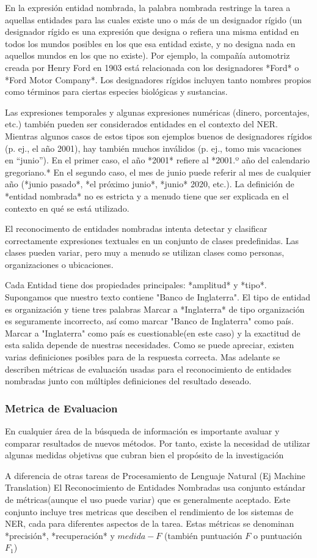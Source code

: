 \documentclass{llncs}
\begin{document}
	En la expresión entidad nombrada, la palabra nombrada restringe la tarea a aquellas entidades para las cuales existe uno o más de un designador rígido (un designador rígido es una expresión que designa o refiera una misma entidad en todos los mundos posibles en los que esa entidad existe, y no designa nada en aquellos mundos en los que no existe). Por ejemplo, la compañía automotriz creada por Henry Ford en 1903 está relacionada con los designadores *Ford* o *Ford Motor Company*. Los designadores rígidos incluyen tanto nombres propios como términos para ciertas especies biológicas y sustancias.
	
	Las expresiones temporales y algunas expresiones numéricas (dinero, porcentajes, etc.) también pueden ser considerados entidades en el contexto del NER. Mientras algunos casos de estos tipos son ejemplos buenos de designadores rígidos (p. ej., el año 2001), hay también muchos inválidos (p. ej., tomo mis vacaciones en “junio”). En el primer caso, el año *2001* refiere al *2001.º año del calendario gregoriano.* En el segundo caso, el mes de junio puede referir al mes de cualquier año (*junio pasado*, *el próximo junio*, *junio* 2020, etc.). La definición de *entidad nombrada* no es estricta y a menudo tiene que ser explicada en el contexto en qué se está utilizado.
	
	El reconocimento de  entidades nombradas intenta detectar y clasificar correctamente expresiones textuales en un conjunto de clases predefinidas. Las clases pueden variar, pero muy a menudo se utilizan clases como personas, organizaciones o ubicaciones. 
	
	Cada Entidad tiene dos propiedades principales:  *amplitud* y *tipo*. Supongamos que nuestro texto contiene "Banco de Inglaterra". El tipo de entidad es organización y tiene tres palabras Marcar a *Inglaterra* de tipo organización es seguramente incorrecto, así como marcar "Banco de Inglaterra" como país. Marcar a "Inglaterra" como país es cuestionable(en este caso) y la exactitud de esta salida depende de nuestras necesidades. Como se puede apreciar, existen varias definiciones posibles para de la respuesta correcta. Mas adelante se describen métricas de evaluación usadas para el reconocimiento de entidades nombradas junto con múltiples definiciones del resultado deseado.  
	
	\subsubsection{Metrica de Evaluacion}
	En cualquier área de la búsqueda de información es importante avaluar y comparar resultados de nuevos métodos. Por tanto, existe la necesidad de utilizar algunas medidas objetivas que cubran bien el propósito de la investigación 
	
	A diferencia de otras tareas de Procesamiento de Lenguaje Natural (Ej Machine Translation) El Reconocimiento de Entidades Nombradas usa conjunto estándar de métricas(aunque el uso puede variar) que es generalmente aceptado. Este conjunto incluye tres metricas que desciben el rendimiento de los sistemas de NER, cada para diferentes aspectos de la tarea. Estas métricas se denominan *precisión*, *recuperación* y $medida-F$ (también puntuación $F$ o puntuación $F_1$)
	
\end{document}
